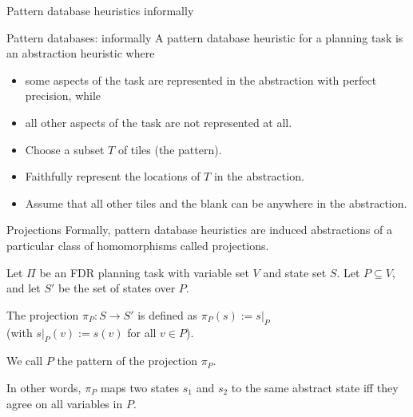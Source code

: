 \documentclass{gkibeamer}
\begin{document}
\begin{frame}{Pattern database heuristics informally}
  \begin{block}{Pattern databases: informally}
    A pattern database heuristic for a planning task is an abstraction
    heuristic where
    \begin{itemize}
    \item some aspects of the task are represented in the abstraction
      \alert{with perfect precision}, while
    \item all other aspects of the task are \alert{not represented at
      all}.
    \end{itemize}
  \end{block}

  \begin{example}[15-puzzle]
    \begin{itemize}
    \item Choose a subset $T$ of tiles (the \alert{pattern}).
    \item Faithfully represent the locations of $T$ in the
      abstraction.
    \item Assume that all other tiles and the blank can be anywhere in
      the abstraction.
    \end{itemize}
  \end{example}
\end{frame}

\begin{frame}{Projections}
  Formally, pattern database heuristics are induced abstractions of a
  particular class of homomorphisms called \alert{projections}.

  \begin{definition}[projections]
    Let $\Pi$ be an FDR planning task with variable set $V$ and state
    set $S$. Let $P \subseteq V$, and let $S'$ be the set of states
    over $P$.

    \smallskip

    The \alert{projection} $\pi_P: S \to S'$ is defined as $\pi_P(s)
    := s|_P$\\
    (with $s|_P(v) := s(v)$ for all $v \in P$).

    \smallskip

    We call $P$ the \alert{pattern} of the projection $\pi_P$.
  \end{definition}
  
  In other words, $\pi_P$ maps two states $s_1$ and $s_2$ to the same
  abstract state iff they agree on all variables in $P$.
\end{frame}
\end{document}
